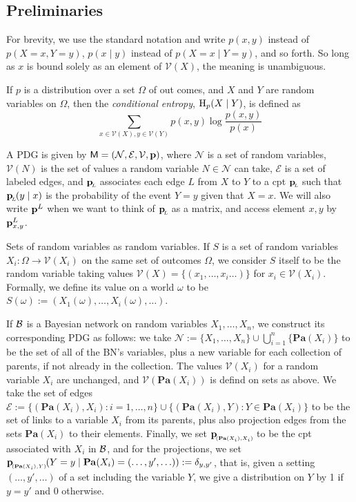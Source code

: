 \documentclass{article}
\newcommand{\bp}[1][L]{\mat{p}_{\!_{#1}\!}}
\newcommand{\V}{\mathcal V}
\newcommand{\N}{\mathcal N}
\newcommand{\Ed}{\mathcal E}
\newcommand{\sfM}{\mathsf M}
\def\mnvars[#1]{(\N#1, \Ed#1, \V#1, \mat p #1)}
\def\Pa{\mathbf{Pa}}
\begin{document}
\subsection*{Preliminaries}

For brevity, we use the standard notation and write $p(x, y)$ instead of $p(X \!=\! x, Y \!=\! y)$, $p(x \mid y)$ instead of $p(X \!=\! x\mid Y \!=\! y)$, and so forth. So long as $x$ is bound solely as an element of $\V(X)$, the meaning is unambiguous. 


\begin{defn}
	If $p$ is a distribution over a set $\Omega$ of out comes, and $X$ and $Y$ are random variables on $\Omega$, then the \emph{conditional entropy}, $\mathrm{H}_p(X \mid Y)$, is defined as 
	\[ \sum_{x \in \V(X), y \in \V(Y)} p(x,y) \log \frac{p(x,y)}{p(x)} \]
\end{defn}


\begin{defn}
	A PDG is given by $\sfM = \mnvars[]$, where $\N$ is a set of random variables, $\V(N)$ is the set of values a random variable $N \in \N$ can take, $\Ed$ is a set of labeled edges, and $\bp$ associates each edge $L$ from $X$ to $Y$ to a cpt $\bp$ such that $\bp(y \mid x)$ is the probability of the event $Y = y$ given that $X = x$. We will also write $\mathbf p^L$ when we want to think of $\bp[L]$ as a matrix, and access element $x,y$ by  $\mathbf p^L_{x,y}$.
\end{defn}

\begin{defn} \label{def:set-rv}
	Sets of random variables as random variables. If $S$ is a set of random variables $X_i : \Omega \to \V(X_i)$ on the same set of outcomes $\Omega$, we consider $S$ itself to be the random variable taking values $\V(X) = \{(x_1, \ldots, x_i \ldots) \}$ for $x_i \in \V(X_i)$. Formally, we define its value on a world $\omega$ to be $S(\omega) := (X_1(\omega), \ldots, X_i(\omega), \ldots)$. 
\end{defn}

\begin{defn}\label{def:gamma}
	If $\cal B$ is a Bayesian network on random variables $X_1, \ldots, X_n$, we construct its corresponding PDG as follows: we take $\N := \{X_1, \ldots, X_n \} \cup \bigcup_{i=1}^n\{ \Pa(X_i) \}$ to be the set of all of the BN's variables, plus a new variable for each collection of parents, if not already in the collection. The values $\V(X_i)$ for a random variable $X_i$ are unchanged, and $\V(\Pa(X_i))$ is defind on sets as above.		
	We take the set of edges $\Ed := \{ (\Pa(X_i), X_i) : i = 1, \ldots, n \} \cup \{ (\Pa(X_i), Y) : Y \in \Pa(X_i)\}$ to be the set of links to a variable $X_i$ from its parents, plus also projection edges from the sets $\Pa(X_i)$ to their elements. 
	Finally, we set $\bp[(\Pa(X_i), X_i)]$ to be the cpt associated with $X_i$ in $\cal B$, and for the projections, we set $\bp[(\Pa(X_i), Y)](Y = y \mid \Pa(X_i) = (\ldots, y', \ldots)) := \delta_{y,y'}$, that is, given a setting $(\ldots, y', \ldots)$ of a set including the variable $Y$, we give a distribution on $Y$ by  1 if $y = y'$ and 0 otherwise.
\end{defn}
\end{document}

